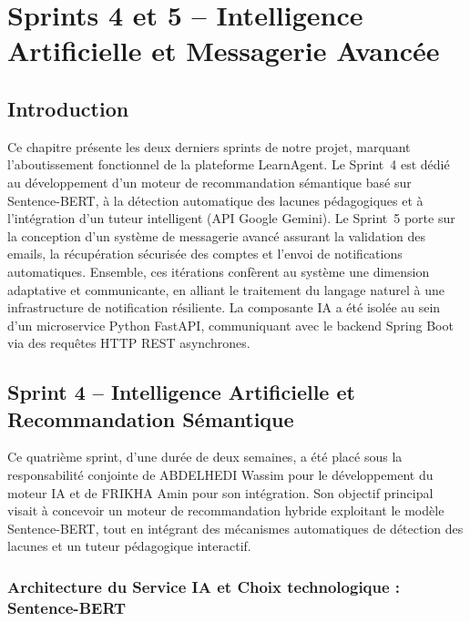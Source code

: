 \chapter{Sprints 4 et 5 -- Intelligence Artificielle et Messagerie Avancée}


\section*{Introduction}
Ce chapitre présente les deux derniers sprints de notre projet, marquant l'aboutissement fonctionnel de la plateforme LearnAgent. Le Sprint~4 est dédié au développement d'un moteur de recommandation sémantique basé sur Sentence-BERT, à la détection automatique des lacunes pédagogiques et à l'intégration d'un tuteur intelligent (API Google Gemini). Le Sprint~5 porte sur la conception d'un système de messagerie avancé assurant la validation des emails, la récupération sécurisée des comptes et l'envoi de notifications automatiques. Ensemble, ces itérations confèrent au système une dimension adaptative et communicante, en alliant le traitement du langage naturel à une infrastructure de notification résiliente. La composante IA a été isolée au sein d'un microservice Python FastAPI, communiquant avec le backend Spring Boot via des requêtes HTTP REST asynchrones.


\section{Sprint 4 -- Intelligence Artificielle et Recommandation Sémantique}

Ce quatrième sprint, d'une durée de deux semaines, a été placé sous la responsabilité conjointe de ABDELHEDI Wassim pour le développement du moteur IA et de FRIKHA Amin pour son intégration. Son objectif principal visait à concevoir un moteur de recommandation hybride exploitant le modèle Sentence-BERT, tout en intégrant des mécanismes automatiques de détection des lacunes et un tuteur pédagogique interactif.

\subsection{Architecture du Service IA et Choix technologique : Sentence-BERT}

